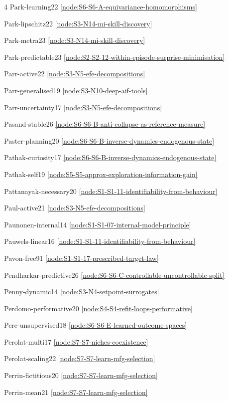 \documentclass[10pt]{article}
\begin{document}
{\begin{multicols}{4}
Park-learning22 \hfill \ref{node:S6-S6-A-equivariance-homomorphisms}\par
Park-lipschitz22 \hfill \ref{node:S3-N14-mi-skill-discovery}\par
Park-metra23 \hfill \ref{node:S3-N14-mi-skill-discovery}\par
Park-predictable23 \hfill \ref{node:S2-S2-12-within-episode-surprise-minimisation}\par
Parr-active22 \hfill \ref{node:S3-N5-efe-decompositions}\par
Parr-generalised19 \hfill \ref{node:S3-N10-deep-aif-tools}\par
Parr-uncertainty17 \hfill \ref{node:S3-N5-efe-decompositions}\par
Pasand-stable26 \hfill \ref{node:S6-S6-B-anti-collapse-as-reference-measure}\par
Paster-planning20 \hfill \ref{node:S6-S6-B-inverse-dynamics-endogenous-state}\par
Pathak-curiosity17 \hfill \ref{node:S6-S6-B-inverse-dynamics-endogenous-state}\par
Pathak-self19 \hfill \ref{node:S5-S5-approx-exploration-information-gain}\par
Pattanayak-necessary20 \hfill \ref{node:S1-S1-11-identifiability-from-behaviour}\par
Paul-active21 \hfill \ref{node:S3-N5-efe-decompositions}\par
Paunonen-internal14 \hfill \ref{node:S1-S1-07-internal-model-principle}\par
Pauwels-linear16 \hfill \ref{node:S1-S1-11-identifiability-from-behaviour}\par
Pavon-free91 \hfill \ref{node:S1-S1-17-prescribed-target-law}\par
Pendharkar-predictive26 \hfill \ref{node:S6-S6-C-controllable-uncontrollable-split}\par
Penny-dynamic14 \hfill \ref{node:S3-N4-setpoint-surrogates}\par
Perdomo-performative20 \hfill \ref{node:S4-S4-refit-loops-performative}\par
Pere-unsupervised18 \hfill \ref{node:S6-S6-E-learned-outcome-spaces}\par
Perolat-multi17 \hfill \ref{node:S7-S7-niches-coexistence}\par
Perolat-scaling22 \hfill \ref{node:S7-S7-learn-mfg-selection}\par
Perrin-fictitious20 \hfill \ref{node:S7-S7-learn-mfg-selection}\par
Perrin-mean21 \hfill \ref{node:S7-S7-learn-mfg-selection}\par

\end{multicols}}
\end{document}
